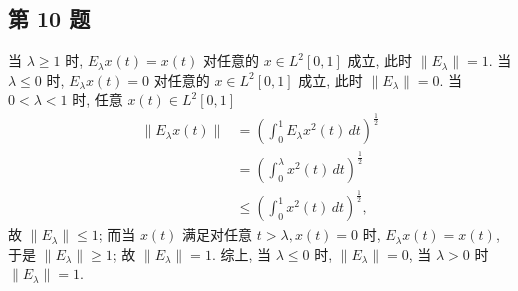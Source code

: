\documentclass[../main.tex]{subfiles}
\begin{document}
\subsection{第 10 题}
当 $\lambda \geqslant 1$ 时, $E_{\lambda} x(t) = x(t)$ 对任意的 $x \in L^2[0, 1]$ 成立, 此时 $\| E_{\lambda} \| = 1$.
当 $\lambda \leqslant 0$ 时, $E_{\lambda} x(t) = 0$ 对任意的 $x \in L^2[0, 1]$ 成立, 此时 $\| E_{\lambda} \| = 0$. 
当 $ 0 < \lambda < 1$ 时, 任意 $x(t) \in L^2[0, 1]$
\begin{align*}
    \| E_{\lambda} x(t) \| &= (\int_0^1 E_{\lambda} x^2(t) \, dt)^{\frac{1}{2}} \\
                           &= (\int_0^{\lambda} x^2(t) \, dt)^{\frac{1}{2}} \\
                           &\leqslant (\int_0^1 x^2(t) \, dt)^{\frac{1}{2}},
\end{align*}
故 $\| E_{\lambda} \| \leqslant 1$;
而当 $x(t)$ 满足对任意 $t > \lambda, x(t) = 0$ 时, $E_{\lambda} x(t) = x(t)$, 于是 $\| E_{\lambda} \| \geqslant 1$;
故 $\| E_{\lambda} \| = 1$.
综上, 当 $\lambda \leqslant 0$ 时, $\| E_{\lambda} \| = 0$, 当 $\lambda > 0$ 时 $\| E_{\lambda} \| = 1$.
\end{document}

